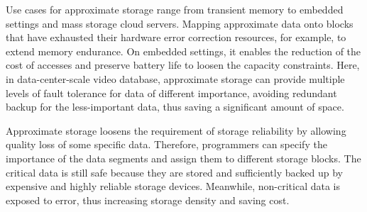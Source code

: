 \documentclass[sigconf]{acmart}
\begin{document}
Use cases for approximate storage range from transient memory to embedded settings and mass storage cloud servers. Mapping approximate data onto blocks that have exhausted their hardware error correction resources, for example, to extend memory endurance. On embedded settings, it enables the reduction of the cost of accesses and preserve battery life to loosen the capacity constraints. \cite{sampson2014approximate} Here, in data-center-scale video database, approximate storage can provide multiple levels of fault tolerance for data of different importance, avoiding redundant backup for the less-important data, thus saving a significant amount of space.


Approximate storage loosens the requirement of storage reliability by allowing quality loss of some specific data. Therefore, programmers can specify the importance of the data segments and assign them to different storage blocks. The critical data is still safe because they are stored and sufficiently backed up by expensive and highly reliable storage devices. Meanwhile, non-critical data is exposed to error, thus increasing storage density and saving cost.

\end{document}
